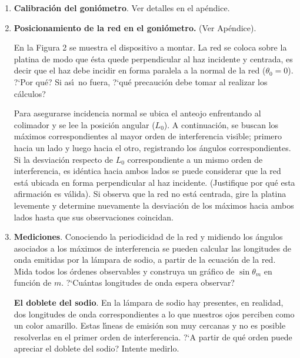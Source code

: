 \documentclass[epj]{svjour}
\begin{document}
\begin{enumerate}
    \item {\bf Calibraci\'on del goni\'ometro}. Ver detalles en el ap\'endice.
    \item {\bf Posicionamiento de la red en el goni\'ometro.} (Ver Ap\'endice). 

        En la Figura 2 se muestra el dispositivo a montar. La red se coloca 
        sobre la platina de modo que \'esta quede perpendicular al haz 
        incidente y centrada, es decir que el haz debe incidir en forma 
        paralela a la normal de la red ($\theta_0 = 0$). ?`Por qu\'e? Si 
        as\'\i\ no fuera, ?`qu\'e precauci\'on debe tomar al realizar los 
        c\'alculos?

        Para asegurarse incidencia normal se ubica el anteojo enfrentando al 
        colimador y se lee la posici\'on angular ($L_0$). A continuaci\'on, 
        se buscan los m\'aximos correspondientes al mayor orden de 
        interferencia visible; primero hacia un lado y luego hacia el otro,
        registrando los \'angulos correspondientes. Si la desviaci\'on respecto
        de $L_0$ correspondiente a un mismo orden de interferencia, es 
        id\'entica hacia ambos lados se puede considerar que la red est\'a 
        ubicada en forma perpendicular al haz incidente. (Justifique por qu\'e
        esta afirmaci\'on es v\'alida). Si observa que la red no est\'a 
        centrada, gire la platina levemente y determine nuevamente la 
        desviaci\'on de los m\'aximos hacia ambos lados hasta que sus 
        observaciones coincidan.

    \item {\bf Mediciones}. Conociendo la periodicidad de la red y midiendo los
        \'angulos asociados a los  m\'aximos de interferencia se pueden 
        calcular las longitudes de onda emitidas por la l\'ampara de sodio, a
        partir de la ecuaci\'on de la red. Mida todos los \'ordenes observables
        y construya un gr\'afico de $\sin \theta_m$ en funci\'on de $m$. 
        ?`Cu\'antas longitudes de onda espera observar?
        
        {\bf El doblete del sodio}. En la l\'ampara de sodio hay presentes,
        en realidad, dos longitudes 
        de onda correspondientes a lo que nuestros ojos perciben como un 
        color amarillo. Estas l\'\i neas de emisi\'on son muy cercanas y no es
        posible resolverlas en el primer orden de interferencia. 
        ?`A partir de qu\'e orden puede apreciar el doblete del sodio? 
        Intente medirlo.
\end{enumerate}
\end{document}
